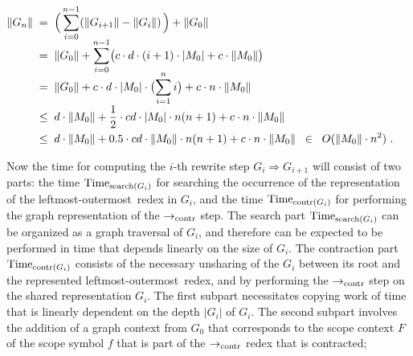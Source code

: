 \documentclass[
submission
]{dmtcs-episciences-tampered}
\newcommand{\fap}[2]{#1({#2})}
\newcommand{\iap}[2]{#1 _{#2}}
\newcommand{\indap}[2]{#1 _{#2}}
\newcommand{\subap}[2]{#1 _{#2}}
\newcommand{\bap}{\subap}
\newcommand{\nb}{\nobreakdash}
\newcommand{\nf}{\normalfont}
\newcommand{\punc}[1]{\ensuremath{\hspace*{3pt}{#1}}}
\newcommand{\sbigOmicron}{O}
\newcommand{\bigOmicron}{\fap{\sbigOmicron}}
\newcommand{\afoscopesym}{f}
\newcommand{\afoscopecxt}{F}
\newcommand{\sdepth}{\text{\nf d}}
\newcommand{\depth}[1]{\lvert{#1}\rvert} \newcommand{\depthbig}[1]{\big\lvert{#1}\big\rvert} \newcommand{\sudepth}{\indap{\sdepth}{\text{\nf u}}}
\newcommand{\size}[1]{\left\lVert{#1}\right\rVert}
\newcommand{\alter}{M}
\newcommand{\alteri}{\indap{\alter}}
\newcommand{\sred}{\to}
\newcommand{\sredi}{\indap{\sred}}
\newcommand{\scriptsearch}{\text{\nf search}}
\newcommand{\scriptcontract}{\text{\nf contr}}
\newcommand{\scontractred}{\sredi{\scriptcontract}}
\newcommand{\lo}{left\-most-outer\-most}
\newcommand{\agraph}{G}
\newcommand{\agraphi}{\iap{\agraph}}
\newcommand{\sgraphred}{{\Longrightarrow}}
\newcommand{\graphred}{\mathrel{\sgraphred}}
\newcommand{\stime}{\text{\nf Time}}
\newcommand{\timei}{\bap{\stime}}
\theoremstyle{plain}
\theoremstyle{definition}
\begin{document}
\begin{center}
  $
  \begin{aligned}
    \size{\agraphi{n}}
      & \; = \;
    \Bigl(\, \sum_{i=0}^{n-1} (\size{\agraphi{i+1}} - \size{\agraphi{i}}) \,\Bigr)  
      +
    \size{\agraphi{0}}
    \\[-1.25ex]
      &
       \; = \;
    \size{\agraphi{0}}
      +
    \sum_{i=0}^{n-1} 
      \bigl( c \cdot d \cdot (i+1) \cdot \depth{\alteri{0}} 
             + c \cdot \size{\alteri{0}} \bigr)
    \\[-1.25ex]
      & \; = \;
    \size{\agraphi{0}}
      +
    c \cdot d \cdot \depth{\alteri{0}} \cdot  
      \bigl( \sum_{i=1}^{n} i \bigr)
     + c \cdot n \cdot \size{\alteri{0}} 
    \\[-0.75ex]
      &
       \; \le \;
    d \cdot \size{\alteri{0}}
      +
    \frac{1}{2} \cdot c d \cdot \depth{\alteri{0}} \cdot n (n + 1)
      + 
    c \cdot n \cdot \size{\alteri{0}}
    \\
      &
       \; \le \;
    d \cdot \size{\alteri{0}}
      +
    0.5 \cdot c d \cdot \size{\alteri{0}} \cdot n (n + 1) 
      + 
    c \cdot n \cdot \size{\alteri{0}}
    \;\; \in \;\; \bigOmicron{ \size{\alteri{0}} \cdot n^2 } \punc{.}
  \end{aligned}
  $
\end{center}
Now the time for computing the $i$\nb-th rewrite step $\agraphi{i} \graphred \agraphi{i+1}$
will consist of two parts: 
the time $\timei{\fap{\scriptsearch}{\agraphi{i}}}$ for searching the occurrence of the representation of the \lo\ redex in $\agraphi{i}$,
and the time $\timei{\fap{\scriptcontract}{\agraphi{i}}}$ for performing the graph representation of the $\scontractred$ step.
The search part $\timei{\fap{\scriptsearch}{\agraphi{i}}}$ can be organized as a graph traversal of $\agraphi{i}$,
and therefore can be expected to be performed in time that depends linearly on the size of $\agraphi{i}$.
The contraction part $\timei{\fap{\scriptcontract}{\agraphi{i}}}$ consists of the necessary unsharing of the $\agraphi{i}$ between its root
and the represented \lo\ redex, and by performing the $\scontractred$ step on the shared representation $\agraphi{i}$. 
The first subpart necessitates copying work of time that is linearly dependent on the depth $\depth{\agraphi{i}}$ of $\agraphi{i}$.
The second subpart involves the addition of a graph context from $\agraphi{0}$ that corresponds to the scope context $\afoscopecxt$
of the scope symbol $\afoscopesym$ that is part of the $\scontractred$ redex that is contracted; 
\end{document}
